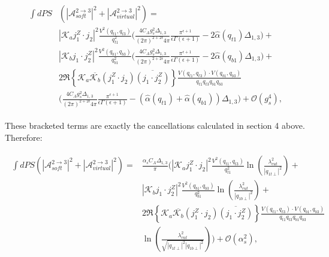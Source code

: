 		\begin{align}
		\begin{split}
			\int dPS&\left(|\mathcal{A}^{2\rightarrow3}_{soft}|^2 + |\mathcal{A}^{2\rightarrow3}_{virtual}|^2\right) =\\
			&|\mathcal{K}_aj_1^Z\cdot j_2|^2 \frac{V^2(q_{t1}, q_{t3})}{q_{t1}^2}
			{\Bigg(\frac{4C_Ag_s^2\Delta_{1,3}}{(2\pi)^{2+2\epsilon}4\pi}\frac{\pi^{\epsilon+1}}
			{\epsilon\Gamma(\epsilon+1)} - 2\hat{\alpha}(q_{t1})\Delta_{1,3}\Bigg)} + \\
			& |\mathcal{K}_bj_1\cdot j_2^Z|^2 \frac{V^2(q_{b1}, q_{b3})}{q_{b1}^2}
			{\Bigg(\frac{4C_Ag_s^2\Delta_{1,3}}{(2\pi)^{2+2\epsilon}4\pi}\frac{\pi^{\epsilon+1}}
			{\epsilon\Gamma(\epsilon+1)} - 2\hat{\alpha}(q_{b1})\Delta_{1,3}\Bigg)}+ \\
			&2\Re\left\{\mathcal{K}_a\overline{\mathcal{K}_b}  (j_1^Z\cdot j_2)\overline{(j_1\cdot j_2^Z)}\right\}
			\frac{V(q_{t1}, q_{t3})\cdot V(q_{b1}, q_{b3})}{q_{t1}q_{t3}q_{b1}q_{b3}}\\
			&{\Bigg(\frac{4C_Ag_s^2\Delta_{1,3}}{(2\pi)^{2+2\epsilon}4\pi}\frac{\pi^{\epsilon+1}}{\epsilon\Gamma(\epsilon+1)} -
			(\hat{\alpha}(q_{t1}) + \hat{\alpha}(q_{b1}))\Delta_{1,3}\Bigg)} + \mathcal{O}(g_s^4),
		\end{split}
		\end{align}

		These bracketed terms are exactly the cancellations calculated in section 4 above.  Therefore:

		\begin{align}
		\begin{split}
			\int dPS\left(|\mathcal{A}^{2\rightarrow3}_{soft}|^2 + |\mathcal{A}^{2\rightarrow3}_{virtual}|^2\right) =&
			\frac{\alpha_sC_A\Delta_{1,3}}{\pi}\Bigg(|\mathcal{K}_aj_1^Z\cdot j_2|^2 \frac{V^2(q_{t1},
			q_{t3})}{q_{t1}^2}\ln\left(\frac{\lambda_{cut}^2}{|q_{1t\perp}|^2}\right)+ \\
			& |\mathcal{K}_bj_1\cdot j_2^Z|^2 \frac{V^2(q_{b1}, q_{b3})}{q_{b1}^2}\ln
			\left(\frac{\lambda_{cut}^2}{|q_{1b\perp}|^2}\right)+ \\
			&2\Re\left\{\mathcal{K}_a\overline{\mathcal{K}_b}  (j_1^Z\cdot j_2)\overline{(j_1\cdot j_2^Z)}\right\}
			\frac{V(q_{t1}, q_{t3})\cdot V(q_{b1}, q_{b3})}{q_{t1}q_{t3}q_{b1}q_{b3}}\\
			&\ln\left(\frac{\lambda_{cut}^2}{\sqrt{|q_{1t\perp}|^2|q_{1b\perp}|^2}}\right)\Bigg) + \mathcal{O}(\alpha_s^2),
		\end{split}
		\end{align}

